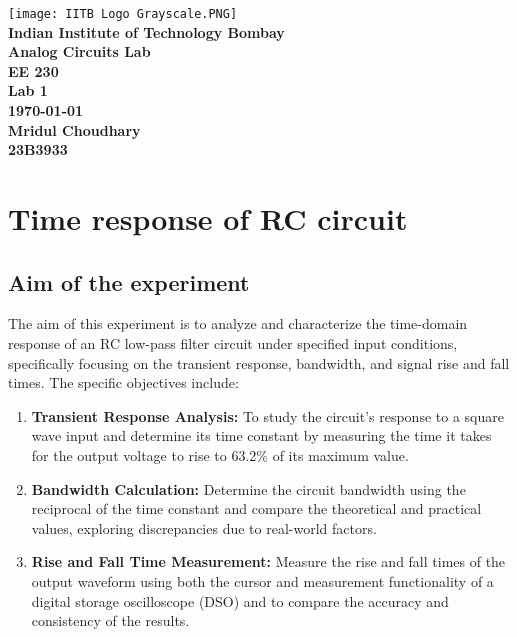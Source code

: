 \documentclass[12pt]{article}
\begin{document}


\begin{titlepage}
    \begin{center}
        \vspace*{2cm}

        \texttt{[image: IITB Logo Grayscale.PNG]}
        \\[1cm]

        {\huge\textbf{Indian Institute of Technology Bombay}} \\[1cm]

        {\huge\textbf{Analog Circuits Lab \\[0.2cm] EE 230}} \\[2cm]
        
        {\Large\textbf{Lab 1 \\[0.2cm] \today }}\\ [2cm]
        
        {\Large\textbf{Mridul Choudhary \\ 23B3933 }}
            
    \end{center}
\end{titlepage}


\newpage
\tableofcontents


\newpage
\section{Time response of RC circuit}
\subsection{Aim of the experiment}
The aim of this experiment is to analyze and characterize the time-domain response of an RC low-pass filter circuit under specified input conditions, specifically focusing on the transient response, bandwidth, and signal rise and fall times. The specific objectives include:

\begin{enumerate}
\item \textbf{Transient Response Analysis:} To study the circuit's response to a square wave input and determine its time constant by measuring the time it takes for the output voltage to rise to 63.2\% of its maximum value.

\item \textbf{Bandwidth Calculation:} Determine the circuit bandwidth using the reciprocal of the time constant and compare the theoretical and practical values, exploring discrepancies due to real-world factors.

\item \textbf{Rise and Fall Time Measurement:} Measure the rise and fall times of the output waveform using both the cursor and measurement functionality of a digital storage oscilloscope (DSO) and to compare the accuracy and consistency of the results.
\end{enumerate}
\end{document}
